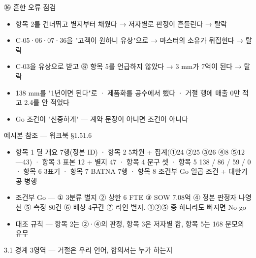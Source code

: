 \begin{frame}{㊱ 흔한 오류 점검}
\begin{itemize}
\item 항목 2를 건너뛰고 별지부터 채웠다 → 저자별로 판정이 흔들린다 → 탈락
\item C-05·06·07·36을 "고객이 원하니 유상"으로 → 마스터의 소유가 뒤집힌다 → 탈락
\item C-03을 유상으로 받고 ㊲ 항목 5를 언급하지 않았다 → 3 mm가 7억이 된다 → 탈락
\item 138 mm를 "1년이면 된다"로 · 제품화를 공수에서 뺐다 · 거절 행에 매출 0만 적고 2.4를 안 적었다
\item Go 조건이 "신중하게" — 계약 문장이 아니면 조건이 아니다
\end{itemize}
\end{frame}

\begin{frame}{예시본 참조 — 워크북 §1.5\til{}1.6}
\begin{itemize}
\item 항목 1 딜 개요 7행(정본 ID) · 항목 2 5차원 + 집계(①24 ②25 ③26 ④8 ⑤12 —43) · 항목 3 표본 12 + 별지 47 · 항목 4 문구 셋 · 항목 5 138 / 86 / 59 / 0 · 항목 6 3표기 · 항목 7 BATNA 7행 · 항목 8 조건부 Go 일곱 조건 + 대한기공 병행
\item 조건부 Go — ① 3분류 별지 ② 상한 6 FTE ③ SOW 7.08억 ④ 정본 판정자 나영선 ⑤ 측정 80건 ⑥ 배상 4구간 ⑦ 라인 별지. ①②⑤ 중 하나라도 빠지면 No-go
\item 대조 규칙 — 항목 2는 ②·④의 판정, 항목 3은 저자별 합, 항목 5는 168 분모의 유무
\end{itemize}
\end{frame}

\begin{frame}{3.1 경계 3영역 — 거절은 우리 언어, 합의서는 누가 하는지}
\end{frame}

